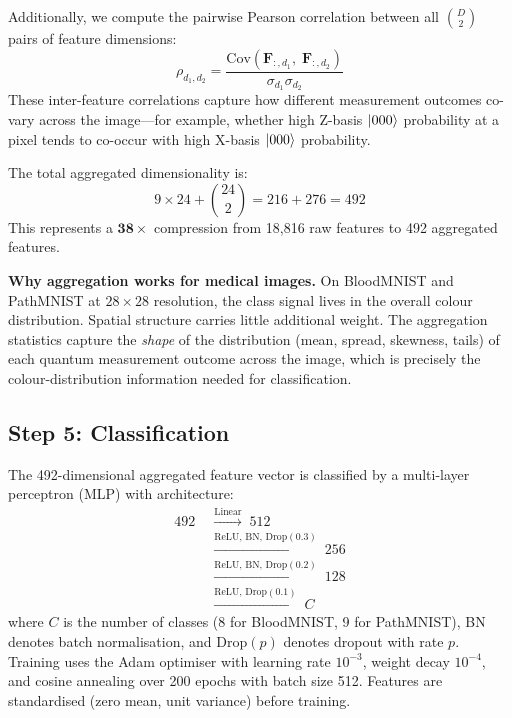 \documentclass[conference,compsoc]{IEEEtran}
\begin{document}
Additionally, we compute the pairwise Pearson correlation between all $\binom{D}{2}$ pairs of feature dimensions:
\begin{equation}
    \rho_{d_1, d_2} = \frac{\text{Cov}(\mathbf{F}_{:,d_1},\; \mathbf{F}_{:,d_2})}{\sigma_{d_1} \sigma_{d_2}}
    \label{eq:corr_features}
\end{equation}
These inter-feature correlations capture how different measurement outcomes co-vary across the image---for example, whether high Z-basis $\ket{000}$ probability at a pixel tends to co-occur with high X-basis $\ket{000}$ probability.

The total aggregated dimensionality is:
\begin{equation}
    9 \times 24 + \binom{24}{2} = 216 + 276 = 492
    \label{eq:total_dim}
\end{equation}
This represents a $\mathbf{38\times}$ compression from 18,816 raw features to 492 aggregated features.

\textbf{Why aggregation works for medical images.}
On BloodMNIST and PathMNIST at $28 \times 28$ resolution, the class signal lives in the overall colour distribution. Spatial structure carries little additional weight.
The aggregation statistics capture the \emph{shape} of the distribution (mean, spread, skewness, tails) of each quantum measurement outcome across the image, which is precisely the colour-distribution information needed for classification.

\subsection{Step 5: Classification}
\label{sec:classifier}

The 492-dimensional aggregated feature vector is classified by a multi-layer perceptron (MLP) with architecture:
\begin{equation}
\begin{aligned}
492 \;&\xrightarrow{\text{Linear}}\; 512 \\
    &\xrightarrow{\text{ReLU, BN, Drop}(0.3)}\; 256 \\
    &\xrightarrow{\text{ReLU, BN, Drop}(0.2)}\; 128 \\
    &\xrightarrow{\text{ReLU, Drop}(0.1)}\; C
\end{aligned}
\label{eq:mlp}
\end{equation}
where $C$ is the number of classes (8 for BloodMNIST, 9 for PathMNIST), BN denotes batch normalisation, and Drop$(p)$ denotes dropout with rate $p$.
Training uses the Adam optimiser with learning rate $10^{-3}$, weight decay $10^{-4}$, and cosine annealing over 200 epochs with batch size 512.
Features are standardised (zero mean, unit variance) before training.
\end{document}
